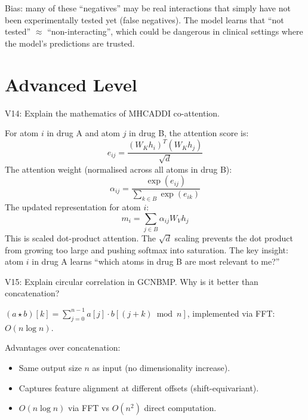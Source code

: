 \documentclass[12pt,a4paper,oneside]{book}
\begin{document}
Bias: many of these ``negatives'' may be real interactions that simply have not been experimentally tested yet (false negatives). The model learns that ``not tested'' $\approx$ ``non-interacting'', which could be dangerous in clinical settings where the model's predictions are trusted.

\section{Advanced Level}

\begin{tcolorbox}[vivabox]
V14: Explain the mathematics of MHCADDI co-attention.
\end{tcolorbox}
For atom $i$ in drug A and atom $j$ in drug B, the attention score is:
\[e_{ij}=\frac{(W_K h_i)^T(W_K h_j)}{\sqrt{d}}\]
The attention weight (normalised across all atoms in drug B):
\[\alpha_{ij}=\frac{\exp(e_{ij})}{\sum_{k \in B}\exp(e_{ik})}\]
The updated representation for atom $i$:
\[m_i=\sum_{j \in B} \alpha_{ij} W_V h_j\]
This is scaled dot-product attention. The $\sqrt{d}$ scaling prevents the dot product from growing too large and pushing softmax into saturation. The key insight: atom $i$ in drug A learns ``which atoms in drug B are most relevant to me?''

\begin{tcolorbox}[vivabox]
V15: Explain circular correlation in GCNBMP. Why is it better than concatenation?
\end{tcolorbox}
$(a\star b)[k] = \sum_{j=0}^{n-1} a[j] \cdot b[(j+k) \bmod n]$, implemented via FFT: $O(n\log n)$.

Advantages over concatenation:
\begin{itemize}
  \item Same output size $n$ as input (no dimensionality increase).
  \item Captures feature alignment at different offsets (shift-equivariant).
  \item $O(n\log n)$ via FFT vs $O(n^2)$ direct computation.
\end{itemize}
\end{document}
